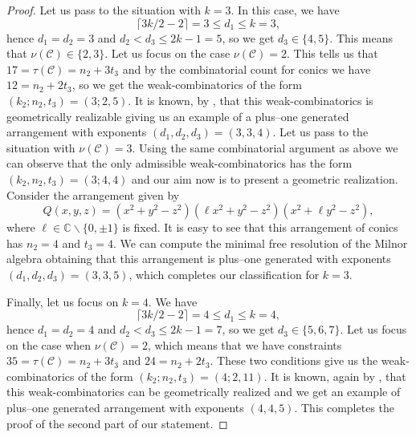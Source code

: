 \documentclass[11pt]{article}
\theoremstyle{plain}
\theoremstyle{definition}
\begin{document}
\begin{proof}
Let us pass to the situation with $k=3$. In this case, we have
$$\lceil3k/2-2\rceil = 3 \leq d_{1} \leq k=3,$$
hence $d_{1}=d_{2} = 3$ and $d_{2} < d_{3} \leq 2k-1 = 5$, so we get $d_{3} \in \{4,5\}$. 
This means that $\nu(\mathcal{C}) \in \{2,3\}$. Let us focus on the case $\nu(\mathcal{C})=2$. This tells us that $17 = \tau(\mathcal{C}) = n_{2} + 3t_{3}$ and by the combinatorial count for conics we have $12 = n_{2} + 2t_{3}$, so we get the weak-combinatorics of the form $(k_{2};n_{2},t_{3}) = (3;2,5)$. It is known, by \cite[Theorem 3.1]{MP}, that this weak-combinatorics is geometrically realizable giving us an example of a plus--one generated arrangement with exponents $(d_{1},d_{2},d_{3})=(3,3,4)$. Let us pass to the situation with $\nu(\mathcal{C}) = 3$. Using the same combinatorial argument as above we can observe that the only admissible weak-combinatorics has the form $(k_{2},n_{2},t_{3}) = (3;4,4)$ and our aim now is to present a geometric realization. Consider the arrangement given by 
$$Q(x,y,z) = (x^2+y^2-z^2)(\ell x^2+y^2-z^2)(x^2+\ell y^2-z^2),$$
where $\ell\in\mathbb{C}\backslash\{0,\pm1\}$ is fixed.
It is easy to see that this arrangement of conics has $n_{2}=4$ and $t_{3}=4$. We can compute the minimal free resolution of the Milnor algebra obtaining that this arrangement is plus--one generated with exponents $(d_{1},d_{2},d_{3})=(3,3,5)$, which completes our classification for $k=3$.

Finally, let us focus on $k=4$. We have
$$\lceil3k/2-2\rceil = 4 \leq d_{1} \leq k=4,$$
hence $d_{1}=d_{2} = 4$ and $d_{2} < d_{3} \leq 2k-1 = 7$, so we get $d_{3} \in \{5,6,7\}$.  Let us focus on the case when $\nu(\mathcal{C})=2$, which means that we have constraints $35=\tau(\mathcal{C})=n_{2}+3t_{3}$ and $24 = n_{2}+2t_{3}$. These two conditions give us the weak-combinatorics of the form $(k_{2};n_{2},t_{3}) = (4;2,11)$. It is known, again by \cite[Theorem 3.1]{MP}, that this weak-combinatorics can be geometrically realized and we get an example of plus--one generated arrangement with exponents $(4,4,5)$. This completes the proof of the second part of our statement.
\end{proof}
\end{document}
